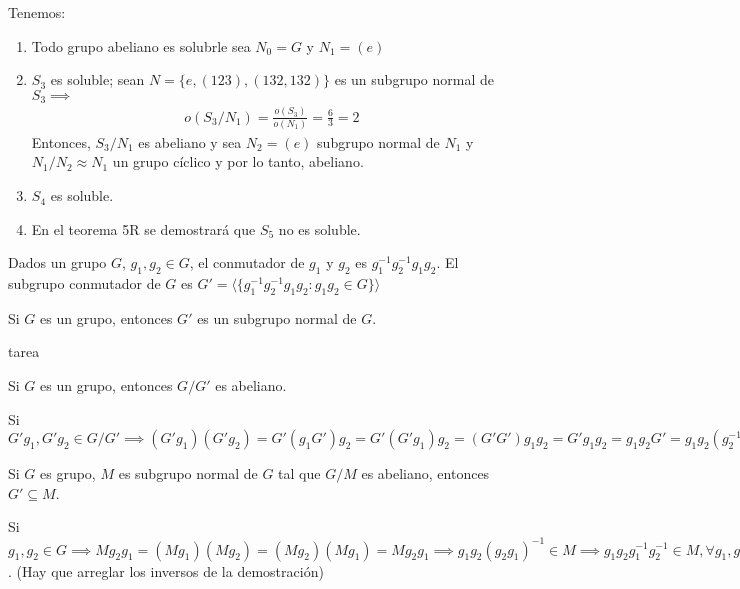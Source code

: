 \begin{ejemplo}
    Tenemos:
    \begin{enumerate}
        \item Todo grupo abeliano es solubrle sea $N_0=G$ y $N_1=(e)$
        \item $S_3$ es soluble; sean $N=\{e,(123),(132,132)\}$ es un subgrupo normal de $S_3\implies$
        \begin{align*}
            o\left(S_3/N_1\right) = \frac{o(S_3)}{o(N_1)}=\frac{6}{3}=2
        \end{align*}
        Entonces, $S_3/N_1$ es abeliano y sea $N_2=(e)$ subgrupo normal de $N_1$ y $N_1/N_2\approx N_1$ un grupo cíclico y por lo tanto, abeliano. 
        \item $S_4$ es soluble. 
        \item En el teorema 5R se demostrará que $S_5$ no es soluble. 
    \end{enumerate}
\end{ejemplo}

\begin{definicion}
    Dados un grupo $G$, $g_1,g_2\in G$, el conmutador de $g_1$ y $g_2$ es $g_1^{-1}g_2^{-1}g_1g_2$. El subgrupo conmutador de $G$ es $G'=\langle\{g_1^{-1}g_2^{-1}g_1g_2:g_1g_2\in G\}\rangle$
\end{definicion}

\begin{prop}
    Si $G$ es un grupo, entonces $G'$ es un subgrupo normal de $G$.
    \begin{dem}
        tarea
    \end{dem}
\end{prop}

\begin{prop}
    Si $G$ es un grupo, entonces $G/G'$ es abeliano. 
    \begin{dem}
        Si $G'g_1,G'g_2\in G/G'\implies (G'g_1)(G'g_2)=G'(g_1G')g_2=G'(G'g_1)g_2=(G'G')g_1g_2=G'g_1g_2=g_1g_2G'=g_1g_2(g_2^{-1}g_1^{-1}g_2g_1G')=g_1(g_2g_2^{-1})g_1^{-1}g_2g_1G'=g_1eg_1^{-1}g_2g_1G'= g_2g_1^{-1}g_2g_1G' = eg_2g_2G'=g_2g_1G'=G'g_2g_1=(G'g_2)(G'g_1)$
    \end{dem}
\end{prop}

\begin{prop}
    Si $G$ es grupo, $M$ es subgrupo normal de $G$ tal que $G/M$ es abeliano, entonces $G'\subseteq M$.
    \begin{dem}
        Si $g_1,g_2\in G\implies Mg_2g_1=(Mg_1)(Mg_2)=(Mg_2)(Mg_1)=Mg_2g_1\implies g_1g_2(g_2g_1)^{-1}\in M\implies g_1g_2g_1^{-1}g_2^{-1}\in M,\forall g_1,g_2\in G\implies G'\subseteq M$. (Hay que arreglar los inversos de la demostración)
    \end{dem}
\end{prop}

